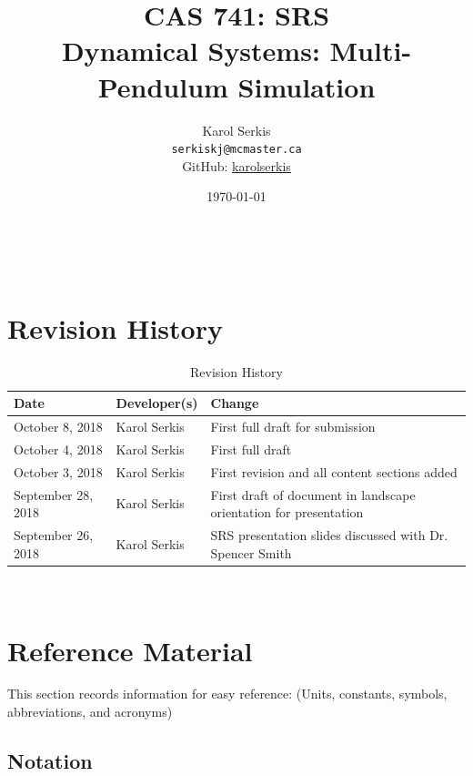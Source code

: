 \documentclass[12pt]{article}
\newcommand{\progname}{Multi-Pendulum Simulation }
\begin{document}

\title{CAS 741: SRS\\[10pt]\Large Dynamical Systems: \progname}
\author{Karol Serkis\\\texttt{serkiskj@mcmaster.ca}\\GitHub:
\href{https://www.github.com/karolserkis}{karolserkis}}
\date{\today}
	
\maketitle

~\newpage

\tableofcontents

\clearpage

\setcounter{secnumdepth}{0}

\section{Revision History}

\begin{table}[hp]
\caption{Revision History}
\begin{tabularx}{\textwidth}{llX}
\toprule
\textbf{Date} & \textbf{Developer(s)} & \textbf{Change}\\
\midrule
October 8, 2018 & Karol Serkis &  First full draft for submission\\
October 4, 2018 & Karol Serkis &  First full draft\\
October 3, 2018 & Karol Serkis & First revision and all content sections added\\September 28, 2018 & 
Karol Serkis & First draft of document in landscape
orientation for presentation\\
September 26, 2018 & Karol Serkis & SRS presentation slides discussed with Dr.
Spencer Smith \\
\bottomrule
\end{tabularx}
\end{table}

~\newpage

\section{Reference Material}

This section records information for easy reference: (Units, constants, symbols, abbreviations, and acronyms)

\subsection{Notation}
\end{document}
